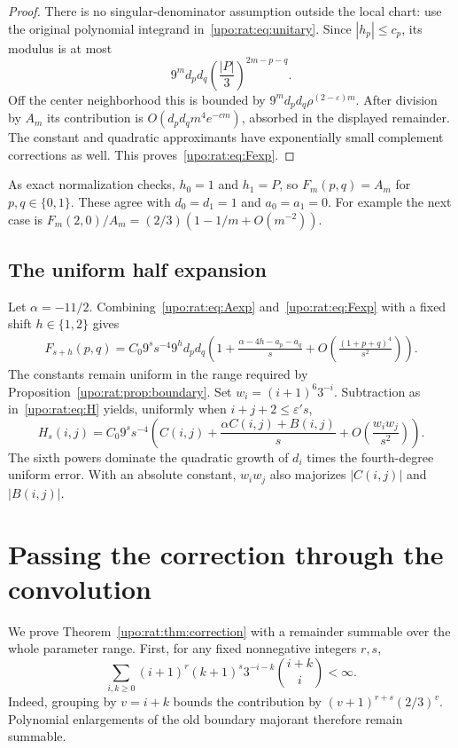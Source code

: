 \documentclass[11pt,letterpaper]{article}
\theoremstyle{remark}\newtheorem{remark}[theorem]{Remark}
\numberwithin{equation}{section}
\begin{document}
\begin{proof}
There is no singular-denominator assumption outside the local chart:
use the original polynomial integrand in~\eqref{upo:rat:eq:unitary}. Since
$|h_p|\le c_p$, its modulus is at most
\[
9^m d_pd_q\left(\frac{|P|}{3}\right)^{2m-p-q}.
\]
Off the center neighborhood this is bounded by
$9^m d_pd_q\rho^{(2-\varepsilon)m}$.
After division by $A_m$ its contribution is
$O(d_pd_qm^4e^{-cm})$, absorbed in the displayed remainder.
The constant and quadratic approximants have exponentially small
complement corrections as well. This proves~\eqref{upo:rat:eq:Fexp}.
\end{proof}

As exact normalization checks, $h_0=1$ and $h_1=P$, so
$F_m(p,q)=A_m$ for $p,q\in\{0,1\}$. These agree with
$d_0=d_1=1$ and $a_0=a_1=0$. For example the next case is
$F_m(2,0)/A_m=(2/3)(1-1/m+O(m^{-2}))$.

\subsection{The uniform half expansion}
Let $\alpha=-11/2$. Combining~\eqref{upo:rat:eq:Aexp} and~\eqref{upo:rat:eq:Fexp}
with a fixed shift $h\in\{1,2\}$ gives
\begin{align}\label{upo:rat:eq:shiftF}
F_{s+h}(p,q)=C_0 9^s s^{-4}9^h d_pd_q
\left(1+\frac{\alpha-4h-a_p-a_q}{s}
+O\left(\frac{(1+p+q)^4}{s^2}\right)\right).
\end{align}
The constants remain uniform in the range required by
Proposition~\ref{upo:rat:prop:boundary}. Set $w_i=(i+1)^6 3^{-i}$.
Subtraction as in~\eqref{upo:rat:eq:H} yields, uniformly when
$i+j+2\le\varepsilon' s$,
\begin{equation}\label{upo:rat:eq:Hexp}
H_s(i,j)=C_0 9^s s^{-4}
\left(C(i,j)+\frac{\alpha C(i,j)+B(i,j)}s
+O\left(\frac{w_iw_j}{s^2}\right)\right).
\end{equation}
The sixth powers dominate the quadratic growth of $d_i$ times the
fourth-degree uniform error. With an absolute constant, $w_iw_j$ also
majorizes $|C(i,j)|$ and $|B(i,j)|$.

\section{Passing the correction through the convolution}\label{upo:rat:sec:convolution}
We prove Theorem~\ref{upo:rat:thm:correction} with a remainder summable over the
whole parameter range. First, for any fixed nonnegative integers $r,s$,
\begin{equation}\label{upo:rat:eq:polysummable}
\sum_{i,k\ge0}(i+1)^r(k+1)^s3^{-i-k}\binom{i+k}{i}<\infty.
\end{equation}
Indeed, grouping by $v=i+k$ bounds the contribution by
$(v+1)^{r+s}(2/3)^v$. Polynomial enlargements of the old boundary
majorant therefore remain summable.
\end{document}
